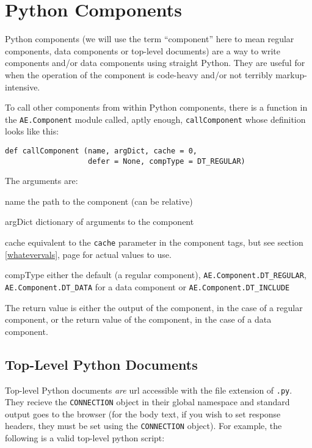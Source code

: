 \documentclass{manual}
\begin{document}
{{\chapter{Python Components}
\label{pythoncode}
Python components (we will use the term ``component'' here to mean
regular components, data components or top-level documents) 
are a way to write components and/or data components using straight
Python.  They are useful for when the operation of the component is
code-heavy and/or not terribly markup-intensive.

To call other components from within Python components, there is a
function in the \texttt{AE.Component} module called, aptly enough,
\texttt{callComponent} whose definition looks like this:

\begin{verbatim}
def callComponent (name, argDict, cache = 0,
                   defer = None, compType = DT_REGULAR)
\end{verbatim}

The arguments are:
\begin{argdesc}
\item[name] the path to the component (can be relative)
\item[argDict] dictionary of arguments to the component
\item[cache] equivalent to the \texttt{cache} parameter in the
component tags, but see section \ref{whatevervals}, page
\pageref{whatevervals} for actual values to use.
\item[compType] either the default (a regular
component), \texttt{AE.Component.DT_REGULAR},
\texttt{AE.Component.DT_DATA} for a data component or
\texttt{AE.Component.DT_INCLUDE}
\end{argdesc}



The return value is either the output of the component, in the case of
a regular component, or the return value of the component, in the case
of a data component.





\section{Top-Level Python Documents}
\label{pythontl}
Top-level Python documents \emph{are} url accessible with the file
extension of \texttt{.py}.  They recieve
the \texttt{CONNECTION} object in their global
namespace and standard output goes to the browser (for the body text, if
you wish to set response headers, they must be set using the
\texttt{CONNECTION} object).  For example, the following is a valid
top-level python script: 

}}
\end{document}

